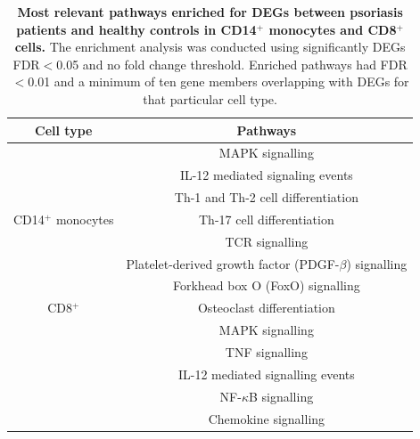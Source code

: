 \begin{table}[htbp]
\centering
\begin{tabular}{@{} c c}
\toprule
\textbf{Cell type} & \textbf{Pathways} \\
\midrule
\midrule
                      & MAPK signalling \\
                      & IL-12 mediated signaling events \\
				              & Th-1 and Th-2 cell differentiation \\
CD14$^+$ monocytes    & Th-17 cell differentiation \\
				              & TCR signalling \\
				              & Platelet-derived growth factor (PDGF-$\beta$) signalling\\
				              & Forkhead box O (FoxO) signalling \\
\midrule				
CD8$^+$  & Osteoclast differentiation \\
         & MAPK signalling \\
				 & TNF signalling \\
         & IL-12 mediated signalling events \\
				 & NF-$\kappa$B signalling \\
				 & Chemokine signalling \\
\bottomrule
\end{tabular}
\medskip %
\caption[Most relevant pathways enriched for DEGs between psoriasis patients and healthy controls in CD14$^+$ monocytes and CD8$^+$ cells.]{\textbf{Most relevant pathways enriched for DEGs between psoriasis patients and healthy controls in CD14$^+$ monocytes and CD8$^+$ cells.} The enrichment analysis was conducted using significantly DEGs FDR$<$0.05 and no fold change threshold. Enriched pathways had FDR$<$0.01 and a minimum of ten gene members overlapping with DEGs for that particular cell type.}
\label{tab:RNAseq_PS_CTL_pathway_enrichment}
\end{table}


